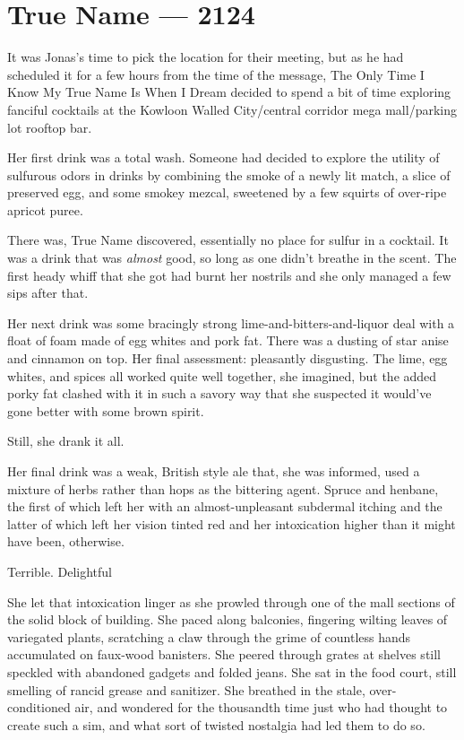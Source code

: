 \hypertarget{true-name-2124}{%
\chapter{True Name — 2124}\label{true-name-2124}}

It was Jonas's time to pick the location for their meeting, but as he had scheduled it for a few hours from the time of the message, The Only Time I Know My True Name Is When I Dream decided to spend a bit of time exploring fanciful cocktails at the Kowloon Walled City/central corridor mega mall/parking lot rooftop bar.

Her first drink was a total wash. Someone had decided to explore the utility of sulfurous odors in drinks by combining the smoke of a newly lit match, a slice of preserved egg, and some smokey mezcal, sweetened by a few squirts of over-ripe apricot puree.

There was, True Name discovered, essentially no place for sulfur in a cocktail. It was a drink that was \emph{almost} good, so long as one didn't breathe in the scent. The first heady whiff that she got had burnt her nostrils and she only managed a few sips after that.

Her next drink was some bracingly strong lime-and-bitters-and-liquor deal with a float of foam made of egg whites and pork fat. There was a dusting of star anise and cinnamon on top. Her final assessment: pleasantly disgusting. The lime, egg whites, and spices all worked quite well together, she imagined, but the added porky fat clashed with it in such a savory way that she suspected it would've gone better with some brown spirit.

Still, she drank it all.

Her final drink was a weak, British style ale that, she was informed, used a mixture of herbs rather than hops as the bittering agent. Spruce and henbane, the first of which left her with an almost-unpleasant subdermal itching and the latter of which left her vision tinted red and her intoxication higher than it might have been, otherwise.

Terrible. Delightful

She let that intoxication linger as she prowled through one of the mall sections of the solid block of building. She paced along balconies, fingering wilting leaves of variegated plants, scratching a claw through the grime of countless hands accumulated on faux-wood banisters. She peered through grates at shelves still speckled with abandoned gadgets and folded jeans. She sat in the food court, still smelling of rancid grease and sanitizer. She breathed in the stale, over-conditioned air, and wondered for the thousandth time just who had thought to create such a sim, and what sort of twisted nostalgia had led them to do so.

